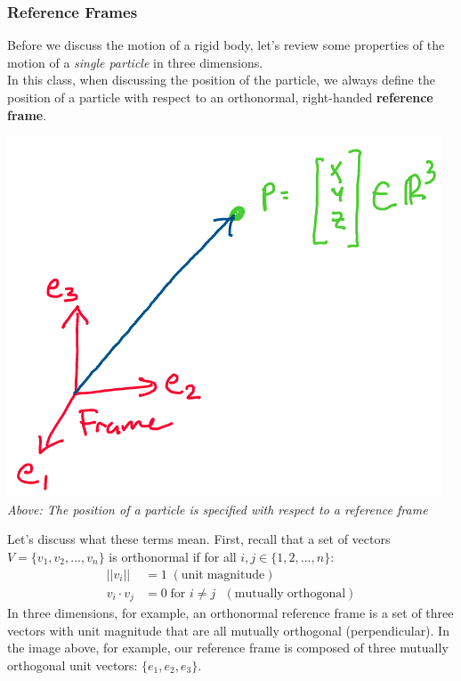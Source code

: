 \documentclass[oneside]{book}
\begin{document}
\subsubsection{Reference Frames}
Before we discuss the motion of a rigid body, let's review some properties of the motion of a \textit{single particle} in three dimensions.\\
In this class, when discussing the position of the particle, we always define the position of a particle with respect to an orthonormal, right-handed \textbf{reference frame}.\\
\begin{center}
    \includegraphics[scale=0.5]{images/refframe.png}\\
    \textit{Above: The position of a particle is specified with respect to a reference frame}
\end{center}
Let's discuss what these terms mean. First, recall that a set of vectors $V = \{v_1, v_2, ..., v_n\}$ is orthonormal if for all $i, j\in\{1,2, ..., n\}$:
\begin{align}
    ||v_i|| &= 1 \; \mathrm{(unit \; magnitude)}\\ 
    v_i\cdot v_j &= 0 \; \text{for $i\neq j$ } \mathrm{(mutually \; orthogonal)}
\end{align}
In three dimensions, for example, an orthonormal reference frame is a set of three vectors with unit magnitude that are all mutually orthogonal (perpendicular). In the image above, for example, our reference frame is composed of three mutually orthogonal unit vectors: $\{e_1, e_2, e_3\}$.\\
\end{document}

